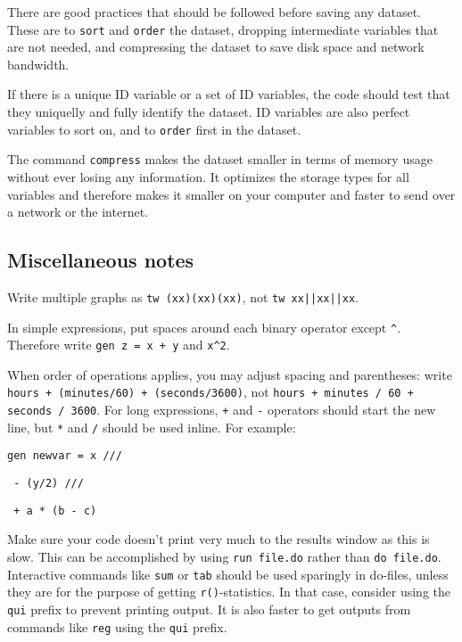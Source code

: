 There are good practices that should be followed before saving any dataset.
These are to \texttt{sort} and \texttt{order} the dataset,
dropping intermediate variables that are not needed,
and compressing the dataset to save disk space and network bandwidth.

If there is a unique ID variable or a set of ID variables,
the code should test that they uniquelly and
fully identify the dataset.
ID variables are also perfect variables to sort on,
and to \texttt{order} first in the dataset.

The command \texttt{compress} makes the dataset smaller in terms of memory usage
without ever losing any information.
It optimizes the storage types for all variables
and therefore makes it smaller on your computer
and faster to send over a network or the internet.


\subsection{Miscellaneous notes}

Write multiple graphs as \texttt{tw (xx)(xx)(xx)}, not \texttt{tw xx||xx||xx}.

\bigskip\noindent In simple expressions, put spaces around each binary operator except \texttt{\^}.
Therefore write \texttt{gen z = x + y} and \texttt{x\^}\texttt{2}.

\bigskip\noindent When order of operations applies, you may adjust spacing and parentheses: write
\texttt{hours + (minutes/60) + (seconds/3600)}, not \texttt{hours + minutes / 60 + seconds / 3600}.
For long expressions, \texttt{+} and \texttt{-} operators should start the new line,
but \texttt{*} and \texttt{/} should be used inline. For example:

\texttt{gen newvar =   x ///}

\texttt{             - (y/2) ///}

\texttt{             + a * (b - c)}

\bigskip\noindent  Make sure your code doesn't print very much to the results window as this is slow.
This can be accomplished by using \texttt{run file.do} rather than \texttt{do file.do}.
Interactive commands like \texttt{sum} or \texttt{tab} should be used sparingly in do-files,
unless they are for the purpose of getting \texttt{r()}-statistics.
In that case, consider using the \texttt{qui} prefix to prevent printing output.
It is also faster to get outputs from commands like \texttt{reg} using the \texttt{qui} prefix.

\mainmatter
